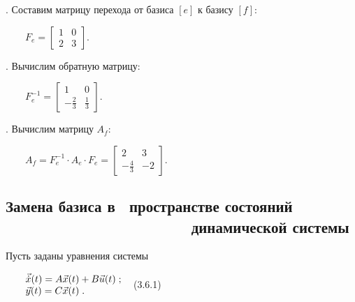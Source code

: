 \documentclass[a4paper]{article}
\begin{document}
{\begin{russian}. Составим матрицу перехода от базиса  $[e]$ к базису  $[f]$:
\end{russian}}

{\begin{russian}\sffamily
\ \ \ \  $F_e=\left[\begin{matrix}1&0\\2&3\end{matrix}\right]$.
\end{russian}}

{\begin{russian}. Вычислим обратную матрицу:
\end{russian}}

{\begin{russian}\sffamily
\ \ \ \  $F_e^{-1}=\left[\begin{matrix}1&0\\-\frac 2 3&\frac 1 3\end{matrix}\right]$.
\end{russian}}

{\begin{russian}. Вычислим матрицу  $A_f$:
\end{russian}}

{\begin{russian}\sffamily
\ \ \ \  $A_f=F_e^{-1}\cdot A_e\cdot F_e=\left[\begin{matrix}2&3\\-\frac 4 3&-2\end{matrix}\right]$.
\end{russian}}


\bigskip

\subsection[Замена базиса в \ пространстве состояний \ \ \ \ \ \ \ \ \ \ \ \ \ \ \ \ \ \ \ \ \ \ динамической
системы]{Замена базиса в \ пространстве состояний \ \ \ \ \ \ \ \ \ \ \ \ \ \ \ \ \ \ \ \ \ \ динамической системы}
\hypertarget{RefHeadingToc455659736}{}
\bigskip

{\begin{russian}\sffamily
Пусть заданы уравнения системы 
\end{russian}}

{\begin{russian}\sffamily
\ \ \ \  $\begin{matrix}\vec{\dot x}(t)=A\vec x(t)+B\vec u(t)\;;\hfill\null \\\vec y(t)=C\vec x(t)\;.\hfill\null
\end{matrix}\hfill $\ \ (3.6.1) \ 
\end{russian}}
\end{document}
